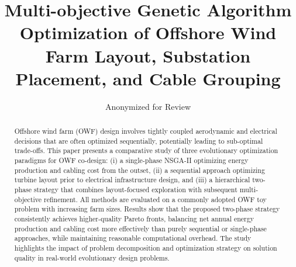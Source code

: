 \documentclass[format=sigconf,anonymous=true,review=true]{acmart}
\begin{document}

\title{Multi-objective Genetic Algorithm Optimization of Offshore Wind Farm Layout, Substation Placement, and Cable Grouping}


\author{Anonymized for Review}

\renewcommand{\shortauthors}{Anonymized et al.}

\begin{abstract}
Offshore wind farm (OWF) design involves tightly coupled aerodynamic and electrical decisions that are often optimized sequentially, potentially leading to sub-optimal trade-offs. This paper presents a comparative study of three evolutionary optimization paradigms for OWF co-design: (i) a single-phase NSGA-II optimizing energy production and cabling cost from the outset, (ii) a sequential approach optimizing turbine layout prior to electrical infrastructure design, and (iii) a hierarchical two-phase strategy that combines layout-focused exploration with subsequent multi-objective refinement. All methods are evaluated on a commonly adopted OWF toy problem with increasing farm sizes. Results show that the proposed two-phase strategy consistently achieves higher-quality Pareto fronts, balancing net annual energy production and cabling cost more effectively than purely sequential or single-phase approaches, while maintaining reasonable computational overhead. The study highlights the impact of problem decomposition and optimization strategy on solution quality in real-world evolutionary design problems.
\end{abstract}


\end{document}
